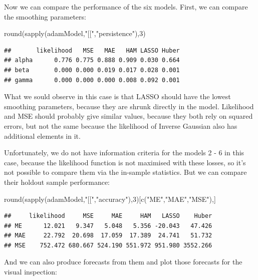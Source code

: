 \documentclass[
]{book}
\newenvironment{Shaded}{\begin{snugshade}}{\end{snugshade}}
\newcommand{\DecValTok}[1]{\textcolor[rgb]{0.00,0.00,0.81}{#1}}
\newcommand{\FunctionTok}[1]{\textcolor[rgb]{0.00,0.00,0.00}{#1}}
\newcommand{\NormalTok}[1]{#1}
\newcommand{\StringTok}[1]{\textcolor[rgb]{0.31,0.60,0.02}{#1}}
\theoremstyle{definition}
\theoremstyle{definition}
\theoremstyle{definition}
\theoremstyle{definition}
\theoremstyle{remark}
\begin{document}
Now we can compare the performance of the six models. First, we can compare the smoothing parameters:

\begin{Shaded}
\begin{Highlighting}[]
\FunctionTok{round}\NormalTok{(}\FunctionTok{sapply}\NormalTok{(adamModel,}\StringTok{"[["}\NormalTok{,}\StringTok{"persistence"}\NormalTok{),}\DecValTok{3}\NormalTok{)}
\end{Highlighting}
\end{Shaded}

\begin{verbatim}
##       likelihood   MSE   MAE   HAM LASSO Huber
## alpha      0.776 0.775 0.888 0.909 0.030 0.664
## beta       0.000 0.000 0.019 0.017 0.028 0.001
## gamma      0.000 0.000 0.000 0.008 0.092 0.001
\end{verbatim}

What we sould observe in this case is that LASSO should have the lowest smoothing parameters, because they are shrunk directly in the model. Likelihood and MSE should probably give similar values, because they both rely on squared errors, but not the same because the likelihood of Inverse Gaussian also has additional elements in it.

Unfortunately, we do not have information criteria for the models 2 - 6 in this case, because the likelihood function is not maximised with these losses, so it's not possible to compare them via the in-sample statistics. But we can compare their holdout sample performance:

\begin{Shaded}
\begin{Highlighting}[]
\FunctionTok{round}\NormalTok{(}\FunctionTok{sapply}\NormalTok{(adamModel,}\StringTok{"[["}\NormalTok{,}\StringTok{"accuracy"}\NormalTok{),}\DecValTok{3}\NormalTok{)[}\FunctionTok{c}\NormalTok{(}\StringTok{"ME"}\NormalTok{,}\StringTok{"MAE"}\NormalTok{,}\StringTok{"MSE"}\NormalTok{),]}
\end{Highlighting}
\end{Shaded}

\begin{verbatim}
##     likelihood     MSE     MAE     HAM   LASSO    Huber
## ME      12.021   9.347   5.048   5.356 -20.043   47.426
## MAE     22.792  20.698  17.059  17.389  24.741   51.732
## MSE    752.472 680.667 524.190 551.972 951.980 3552.266
\end{verbatim}

And we can also produce forecasts from them and plot those forecasts for the visual inspection:
\end{document}

